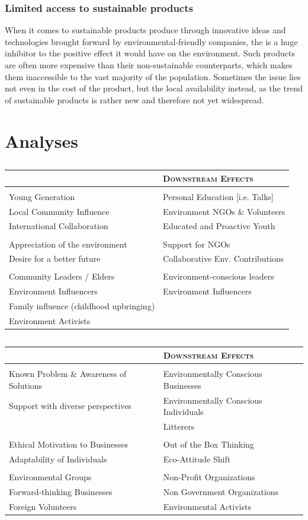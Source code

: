 \documentclass{article}
\newenvironment{SATAnalysis}{
  \vspace{0.25cm}
  \begin{tabular}{>{\raggedright\arraybackslash}p{0.45\textwidth} >{\raggedleft\arraybackslash}p{0.45\textwidth}}
  {\Large \textsc{Upstream Causes}} & {\Large \textsc{Downstream Effects}}\\
}{
  \bottomrule
  \end{tabular}
  \vspace{0.5cm}
}
\newcommand{\SATStructural}{\midrule\multicolumn{2}{c}{\Large \textsc{Structural}}\\ \midrule}
\newcommand{\SATAttitudinal}{\midrule\multicolumn{2}{c}{\Large \textsc{Attitudinal}}\\ \midrule}
\newcommand{\SATTransactional}{\midrule\multicolumn{2}{c}{\Large \textsc{Transactional}}\\ \midrule}
\newcommand{\SATCause}[1]{#1 & \\}
\newcommand{\SATEffect}[1]{ & #1\\}
\newcommand{\SATCauseEffect}[2]{#1 & #2\\}
\newcommand{\hlitheme}[1]{\textbf{\color{purple}{#1}}}
\begin{document}
\subsubsection{Limited access to sustainable products}
\label{subsubsec:limited-access-to-sustainable-products}
When it comes to sustainable products produce through innovative
ideas and technologies brought forward by environmental-friendly
companies, the \hlitheme{limited access to such products} is a huge
inhibitor to the positive effect it would have on the environment.
Such products are often more expensive than their non-sustainable
counterparts, which makes them inaccessible to the vast majority
of the population.
Sometimes the issue lies not even in the cost of the product, but
the local availability instead, as the trend of sustainable products
is rather new and therefore not yet widespread.

\newpage

\section{Analyses}
\subsection{}
\begin{SATAnalysis}
  \SATStructural
  \SATCauseEffect{Young Generation}{Personal Education [i.e. Talks]}
  \SATCauseEffect{Local Community Influence}{Environment NGOs \& Volunteers}
  \SATCauseEffect{International Collaboration}{Educated and Proactive Youth}
  \SATAttitudinal
  \SATCauseEffect{Appreciation of the environment}{Support for NGOs}
  \SATCauseEffect{Desire for a better future}{Collaborative Env. Contributions}
  \SATTransactional
  \SATCauseEffect{Community Leaders / Elders}{Environment-conscious leaders}
  \SATCauseEffect{Environment Influencers}{Environment Influencers}
  \SATCause{Family influence (childhood upbringing)}
  \SATCause{Environment Activists}
\end{SATAnalysis}

\subsection{}
\begin{SATAnalysis}
  \SATStructural
  \SATCauseEffect{Known Problem \& Awareness of Solutions}{Environmentally Conscious Businesses}
  \SATCauseEffect{Support with diverse perspectives}{Environmentally Conscious Individuals}
  \SATEffect{Litterers}
  \SATAttitudinal
  \SATCauseEffect{Ethical Motivation to Businesses}{Out of the Box Thinking}
  \SATCauseEffect{Adaptability of Individuals}{Eco-Attitude Shift}
  \SATTransactional
  \SATCauseEffect{Environmental Groups}{Non-Profit Organizations}
  \SATCauseEffect{Forward-thinking Businesses}{Non Government Organizations}
  \SATCauseEffect{Foreign Volunteers}{Environmental Activists}
\end{SATAnalysis}
\end{document}
